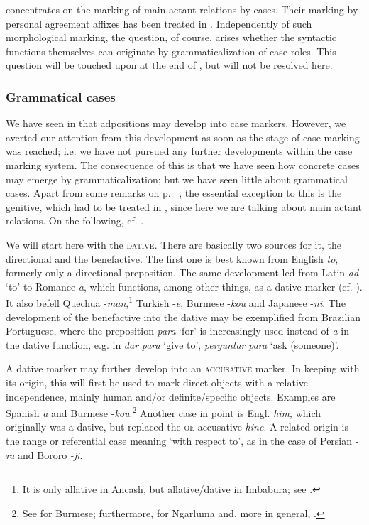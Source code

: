  concentrates on the marking of main actant relations by cases. Their marking by personal agreement affixes has been treated in . Independently of such morphological marking, the question, of course, arises whether the syntactic functions themselves can originate by grammaticalization of case roles. This question will be touched upon at the end of , but will not be resolved here.

\subsubsection{Grammatical cases} \label{sec:3.4.2.2}
We have seen in  that adpositions may develop into case markers. However, we averted our attention from this development as soon as the stage of case marking was reached; i.e. we have not pursued any further developments within the case marking system. The consequence of this is that we have seen how concrete cases may emerge by grammaticalization; but we have seen little about grammatical cases. Apart from some remarks on p.~\pageref{page88}\chk%
 , the essential exception to this is the genitive, which had to be treated in , since here we are talking about main actant relations. On the following, cf. \citealt[218]{Givón1979a}.

We will start here with the \textsc{dative}. There are basically two sources for it, the directional and the benefactive. The first one is best known from English \textit{to}, formerly only a directional preposition. The same development led from Latin \textit{ad} ‘to’ to Romance \textit{a}, which functions, among other things, as a dative marker (cf. ). It also befell Quechua -\textit{man},\footnote{It is only allative in Ancash, but allative/dative in Imbabura; see \citealt[104]{Cole1982}.} Turkish -\textit{e}, Burmese -\textit{kou} and Japanese -\textit{ni}. The development of the benefactive into the dative may be exemplified from Brazilian Portuguese, where the preposition \textit{para} ‘for’ is increasingly used instead of \textit{a} in the dative function, e.g. in \textit{dar} \textit{para} ‘give to’, \textit{perguntar} \textit{para} ‘ask (someone)’.

A dative marker may further develop into an \textsc{accusative} marker. In keeping with its origin, this will first be used to mark direct objects with a relative independence, mainly human and/or definite/specific objects. Examples are Spanish \textit{a} and Burmese -\textit{kou}.\footnote{See \citet{Kölver1985} for Burmese; furthermore, \citet[99]{Dixon1979} for Ngarluma and, more in general, \citet[48f, 166]{MallinsonEtAl1981}.} Another case in point is Engl. \textit{him}, which originally was a dative, but replaced the \textsc{oe} accusative \textit{hine}. A related origin is the range or referential case meaning ‘with respect to’, as in the case of  Persian -\textit{r\=a} and Bororo \textit{{}-ji}.

